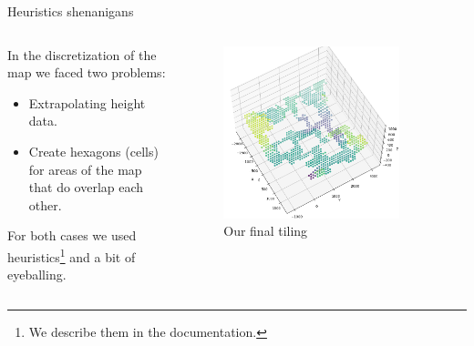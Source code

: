 \documentclass[english]{beamer}
\begin{document}
\begin{frame}{Heuristics shenanigans}
  \begin{columns}
    \begin{column}{0.5\textwidth}
      In the discretization of the map we faced two problems:
      \begin{itemize}
        \item Extrapolating height data.
        \item Create hexagons (cells) for areas of the map that do overlap each other.
      \end{itemize}
      For both cases we used heuristics\footnote{We describe them in the documentation.} and a bit of eyeballing.
    \end{column}
    \begin{column}{0.5\textwidth}
      \begin{figure}[h]
        \centering
        \includegraphics[width=0.85\textwidth]{images/post_tiling2.png}
        \caption{Our final tiling}
      \end{figure}
    \end{column}
  \end{columns}
\end{frame}
\end{document}
